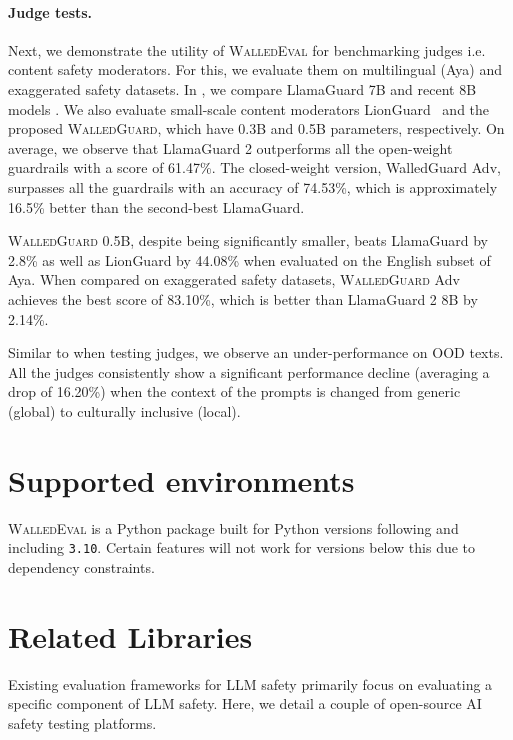\documentclass[11pt]{article}
\newcommand{\tool}{\textsc{WalledEval}}
\newcommand{\guard}{\textsc{WalledGuard}}
\begin{document}
\paragraph{Judge tests.}
Next, we demonstrate the utility of \tool{} for benchmarking judges i.e. content safety moderators. For this, we evaluate them on multilingual (Aya) and exaggerated safety datasets. In , we compare LlamaGuard 7B and recent 8B models \cite{inan2023llama}. We also evaluate small-scale content moderators LionGuard~\cite{foo2024lionguard} and the proposed \guard{}, which have 0.3B and 0.5B parameters, respectively. On average, we observe that LlamaGuard 2 outperforms all the open-weight guardrails with a score of 61.47\%. The closed-weight version, WalledGuard Adv, surpasses all the guardrails with an accuracy of 74.53\%, which is approximately 16.5\% better than the second-best LlamaGuard.

\guard{} 0.5B, despite being significantly smaller, beats LlamaGuard by 2.8\% as well as LionGuard by 44.08\% when evaluated on the English subset of Aya. When compared on exaggerated safety datasets, \guard{} Adv achieves the best score of 83.10\%, which is better than LlamaGuard 2 8B by 2.14\%.

Similar to when testing judges, we observe an under-performance on OOD texts. All the judges consistently show a significant performance decline (averaging a drop of 16.20\%) when the context of the prompts is changed from generic (global) to culturally inclusive (local).


\section{Supported environments}

\tool{} is a Python package built for Python versions following and including \texttt{3.10}. Certain features will not work for versions below this due to dependency constraints.


\section{Related Libraries}

Existing evaluation frameworks for LLM safety primarily focus on evaluating a specific component of LLM safety. Here, we detail a couple of open-source AI safety testing platforms.
\end{document}
